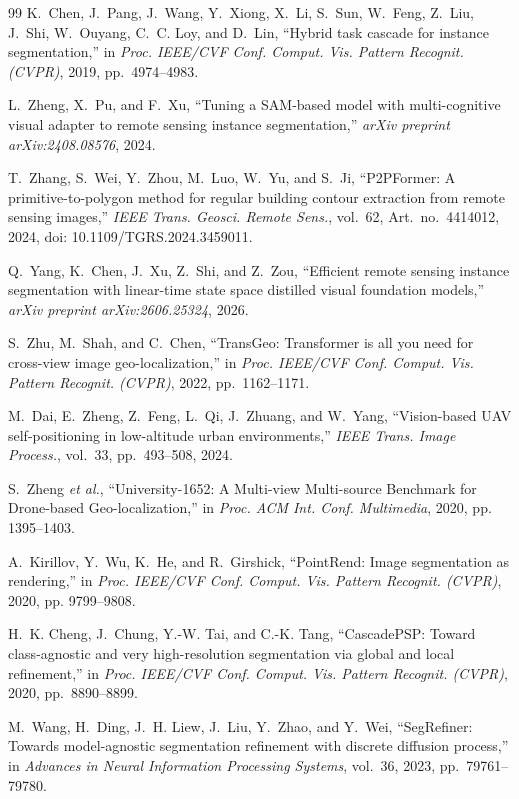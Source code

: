 \documentclass[letterpaper,journal]{IEEEtran}
\begin{document}
\begin{thebibliography}{99}
K.~Chen, J.~Pang, J.~Wang, Y.~Xiong, X.~Li, S.~Sun, W.~Feng, Z.~Liu, J.~Shi, W.~Ouyang, C.~C. Loy, and D.~Lin, ``Hybrid task cascade for instance segmentation,'' in \textit{Proc. IEEE/CVF Conf. Comput. Vis. Pattern Recognit. (CVPR)}, 2019, pp.~4974--4983.

L.~Zheng, X.~Pu, and F.~Xu, ``Tuning a SAM-based model with multi-cognitive visual adapter to remote sensing instance segmentation,'' \textit{arXiv preprint arXiv:2408.08576}, 2024.

T.~Zhang, S.~Wei, Y.~Zhou, M.~Luo, W.~Yu, and S.~Ji, ``P2PFormer: A primitive-to-polygon method for regular building contour extraction from remote sensing images,'' \textit{IEEE Trans. Geosci. Remote Sens.}, vol.~62, Art.~no.~4414012, 2024, doi: 10.1109/TGRS.2024.3459011.

Q.~Yang, K.~Chen, J.~Xu, Z.~Shi, and Z.~Zou, ``Efficient remote sensing instance segmentation with linear-time state space distilled visual foundation models,'' \textit{arXiv preprint arXiv:2606.25324}, 2026.

S.~Zhu, M.~Shah, and C.~Chen, ``TransGeo: Transformer is all you need for cross-view image geo-localization,'' in \textit{Proc. IEEE/CVF Conf. Comput. Vis. Pattern Recognit. (CVPR)}, 2022, pp.~1162--1171.

M.~Dai, E.~Zheng, Z.~Feng, L.~Qi, J.~Zhuang, and W.~Yang, ``Vision-based UAV self-positioning in low-altitude urban environments,'' \textit{IEEE Trans. Image Process.}, vol.~33, pp.~493--508, 2024.

S.~Zheng \textit{et al.}, ``University-1652: A Multi-view Multi-source Benchmark for Drone-based Geo-localization,'' in \textit{Proc. ACM Int. Conf. Multimedia}, 2020, pp. 1395--1403.

A.~Kirillov, Y.~Wu, K.~He, and R.~Girshick, ``PointRend: Image segmentation as rendering,'' in \textit{Proc. IEEE/CVF Conf. Comput. Vis. Pattern Recognit. (CVPR)}, 2020, pp. 9799--9808.

H.~K. Cheng, J.~Chung, Y.-W. Tai, and C.-K. Tang, ``CascadePSP: Toward class-agnostic and very high-resolution segmentation via global and local refinement,'' in \textit{Proc. IEEE/CVF Conf. Comput. Vis. Pattern Recognit. (CVPR)}, 2020, pp.~8890--8899.

M.~Wang, H.~Ding, J.~H. Liew, J.~Liu, Y.~Zhao, and Y.~Wei, ``SegRefiner: Towards model-agnostic segmentation refinement with discrete diffusion process,'' in \textit{Advances in Neural Information Processing Systems}, vol.~36, 2023, pp.~79761--79780.


\end{thebibliography}
\end{document}
